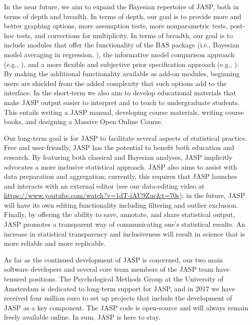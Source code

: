 In the near future, we aim to expand the Bayesian repertoire of JASP, both in terms of depth and breadth. In terms of depth, our goal is to provide more and better graphing options, more assumption tests, more nonparametric tests, post-hoc tests, and corrections for multiplicity. In terms of breadth, our goal is to include modules that offer the functionality of the BAS package (i.e., Bayesian model averaging in regression, ), the informative model comparison approach (e.g., ), and a more flexible and subjective prior specification approach (e.g., ). By making the additional functionality available as add-on modules, beginning users are shielded from the added complexity that such options add to the interface. In the short-term we also aim to develop educational materials that make JASP output easier to interpret and to teach to undergraduate students. This entails writing a JASP manual, developing course materials, writing course books, and designing a Massive Open Online Course.

Our long-term goal is for JASP to facilitate several aspects of statistical practice. Free and user-friendly, JASP has the potential to benefit both education and research. By featuring both classical and Bayesian analyses, JASP implicitly advocates a more inclusive statistical approach. JASP also aims to assist with data preparation and aggregation; currently, this requires that JASP launches and interacts with an external editor (see our data-editing video at \url{https://www.youtube.com/watch?v=1dT-iAU9Zuc&t=70s}); in the future, JASP will have its own editing functionality including filtering and outlier exclusion. Finally, by offering the ability to save, annotate, and share statistical output, JASP promotes a transparent way of communicating one's statistical results. An increase in statistical transparency and inclusiveness will result in science that is more reliable and more replicable.

As far as the continued development of JASP is concerned, our two main software developers and several core team members of the JASP team have tenured positions. The Psychological Methods Group at the University of Amsterdam is dedicated to long-term support for JASP, and in 2017 we have received four million euro to set up projects that include the development of JASP as a key component. The JASP code is open-source and will always remain freely available online. In sum, JASP is here to stay.

